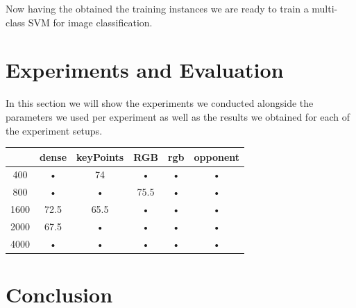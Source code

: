 \documentclass[11pt]{article}
\begin{document}
Now having the obtained the training instances we are ready to train a multi-class SVM for image classification.

\section{Experiments and Evaluation}
In this section we will show the experiments we conducted alongside the parameters we used per experiment as well as the results we obtained for each of the experiment setups.

\begin{table}
\begin{tabular}{c|ccccc}
 & dense & keyPoints & RGB & rgb & opponent \\ 
\hline 
400 & • & 74 & • & • & • \\ 
800 & • & • & 75.5 & • & • \\ 
1600 & 72.5 & 65.5 & • & • & • \\ 
2000 & 67.5 & • & • & • & • \\ 
4000 & • & • & • & • & • \\ 
\end{tabular}
\label{Accuracy of the different models}
\end{table}

\section{Conclusion}

{}

\end{document}
